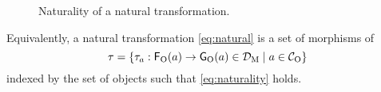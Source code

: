 \begin{definition}
\begin{figure}[htbp]
\begin{center}
    \end{center}
    \caption{Naturality of a natural transformation.}
    \label{fig:naturality}
  \end{figure}

  Equivalently, a natural transformation \eqref{eq:natural} is a set
  of morphisms of 
  \begin{equation}
    \tau = \{\tau_{a}: \mathsf{F}_{\operatorname{O}}(a) \to \mathsf{G}_{\operatorname{O}}(a) \in
    \mathcal{D}_{\operatorname{M}} \mid a \in \mathcal{C}_{\operatorname{O}}\}
  \end{equation}
  indexed by the set of objects  such that
  \eqref{eq:naturality} holds.

\end{definition}

